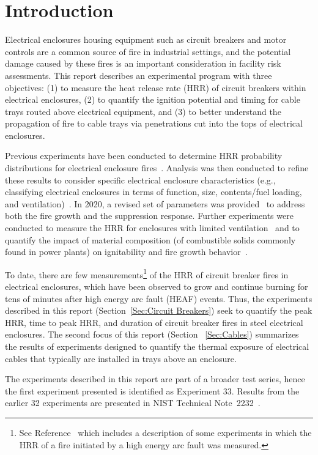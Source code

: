 \section{Introduction}

Electrical enclosures housing equipment such as circuit breakers and motor controls are a common source of fire in industrial settings, and the potential damage caused by these fires is an important consideration in facility risk assessments. This report describes an experimental program with three objectives: (1) to measure the heat release rate (HRR) of circuit breakers within electrical enclosures, (2) to quantify the ignition potential and timing for cable trays routed above electrical equipment, and (3) to better understand the propagation of fire to cable trays via penetrations cut into the tops of electrical enclosures.

Previous experiments have been conducted to determine HRR probability distributions for electrical enclosure fires~\cite{NUREG/CR-7197}. Analysis was then conducted to refine these results to consider specific electrical enclosure characteristics (e.g., classifying electrical enclosures in terms of function, size, contents/fuel loading, and ventilation)~\cite{NUREG-2178}. In 2020, a revised set of parameters was provided~\cite{NUREG2230} to address both the fire growth and the suppression response. Further experiments were conducted to measure the HRR for enclosures with limited ventilation~\cite{OLIVE-FIRE} and to quantify the impact of material composition (of combustible solids commonly found in power plants) on ignitability and fire growth behavior~\cite{leventon2024nist}.

To date, there are few measurements\footnote{See Reference~\cite{NEA_HEAF_2017} which includes a description of some experiments in which the HRR of a fire initiated by a high energy arc fault was measured.} of the HRR of circuit breaker fires in electrical enclosures, which have been observed to grow and continue burning for tens of minutes after high energy arc fault (HEAF) events. Thus, the experiments described in this report (Section~\ref{Sec:Circuit Breakers}) seek to quantify the peak HRR, time to peak HRR, and duration of circuit breaker fires in steel electrical enclosures. The second focus of this report (Section~ \ref{Sec:Cables}) summarizes the results of experiments designed to quantify the thermal exposure of electrical cables that typically are installed in trays above an enclosure.

The experiments described in this report are part of a broader test series, hence the first experiment presented is identified as Experiment 33. Results from the earlier 32 experiments are presented in NIST Technical Note~2232~\cite{OLIVE-FIRE}.

